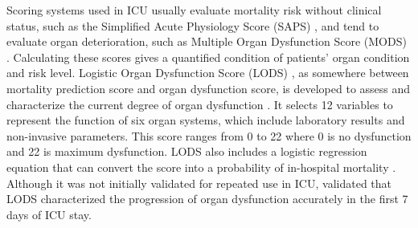 \documentclass[12pt,a4paper,english
]{tunithesis}
\begin{document}
Scoring systems used in ICU usually evaluate mortality risk without clinical status, such as the Simplified Acute Physiology Score (SAPS) \parencite{Gall1984}, and tend to evaluate organ deterioration, such as Multiple Organ Dysfunction Score (MODS) \parencite{Marshall1995}. Calculating these scores gives a quantified condition of patients' organ condition and risk level. Logistic Organ Dysfunction Score (LODS) \parencite{legall96}, as somewhere between mortality prediction score and organ dysfunction score, is developed to assess and characterize the current degree of organ dysfunction \parencite{Tiffany21, Vincent2010}. It selects 12 variables to represent the function of six organ systems, which include laboratory results and non-invasive parameters. This score ranges from 0 to 22 where 0 is no dysfunction and 22 is maximum dysfunction. LODS also includes a logistic regression equation that can convert the score into a probability of in-hospital mortality \parencite{legall96}. Although it was not initially validated for repeated use in ICU, \textcite{Timsit2002} validated that LODS characterized the progression of organ dysfunction accurately in the first 7 days of ICU stay.
\end{document}
